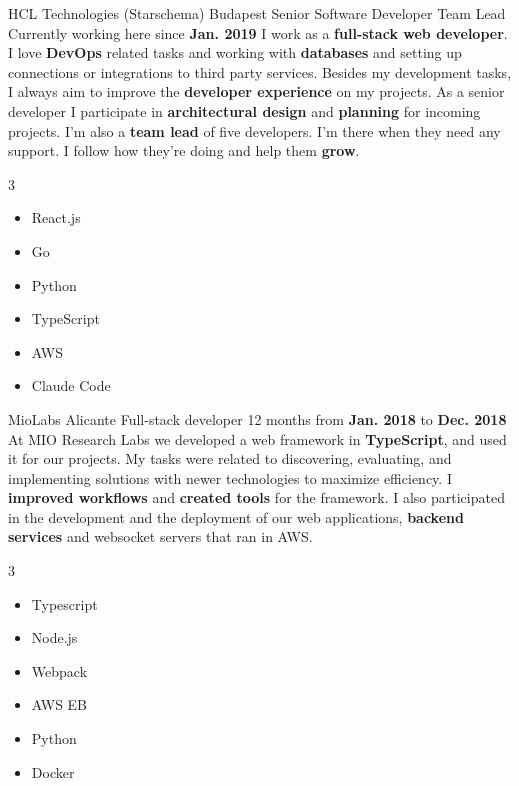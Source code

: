 
\workentry
    {HCL Technologies (Starschema)}
    {Budapest}
    {Senior Software Developer Team Lead}
    {Currently working here since \textbf{Jan. 2019}}
    {}
    {I work as a \textbf{full-stack web developer}. I love \textbf{DevOps} related tasks and working with \textbf{databases}
    and setting up connections or integrations to third party services.
    Besides my development tasks, I always aim to improve the \textbf{developer experience} on my projects.
    As a senior developer I participate in \textbf{architectural design} and \textbf{planning} for incoming projects.
    I'm also a \textbf{team lead} of five developers. I'm there when they need any support.
    I follow how they're doing and help them \textbf{grow}.}
    {\vspace{-\baselineskip}
    \begin{multicols}{3}
    \begin{itemize}
        \item React.js
        \item Go
        \item Python
        \item TypeScript
        \item AWS
        \item Claude Code
    \end{itemize}
    \end{multicols}}
%
\workentry
    {MioLabs}
    {Alicante}
    {Full-stack developer}
    {12 months from \textbf{Jan. 2018} to \textbf{Dec. 2018}}
    {}
    {%
    At MIO Research Labs we developed a web framework in \textbf{TypeScript}, and used it for our projects. My tasks were related to discovering, evaluating, and implementing solutions with newer technologies to maximize efficiency. I \textbf{improved workflows} and \textbf{created tools} for the framework. I also participated in the development and the deployment of our web applications, \textbf{backend services} and websocket servers that ran in AWS.
    }
    {\vspace{-\baselineskip}
    \begin{multicols}{3}
    \begin{itemize}
        \item \small{Typescript}
        \item \small{Node.js}
        \item \small{Webpack}
        \item \small{AWS EB}
        \item \small{Python}
        \item \small{Docker}
    \end{itemize}
    \end{multicols}}
